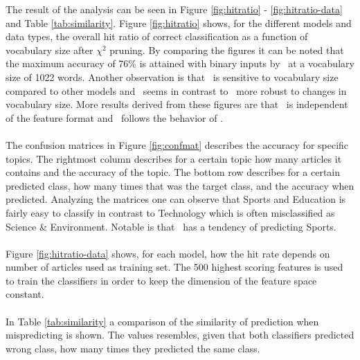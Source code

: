 \label{sec:result}
The result of the analysis can be seen in Figure \ref{fig:hitratio} - \ref{fig:hitratio-data} and Table \ref{tab:similarity}. Figure \ref{fig:hitratio} shows, for the different models and data types, the overall hit ratio of correct classification as a function of vocabulary size after $\chi^2$ pruning. By comparing the figures it can be noted that the maximum accuracy of 76\% is attained with binary inputs by \mn\ at a vocabulary size of 1022 words. Another observation is that \bn\ is sensitive to vocabulary size compared to other models and \svm\  seems in contrast to \bn\ more robust to changes in vocabulary size. More results derived from these figures are that \rf\ is independent of the feature format and \hy\ follows the behavior of \mn.
\\\\
The confusion matrices in Figure \ref{fig:confmat} describes the accuracy for specific topics. The rightmost column describes for a certain topic how many articles it contains and the accuracy of the topic. The bottom row describes for a certain predicted class, how many times that was the target class, and the accuracy when predicted. Analyzing the matrices one can observe that Sports and Education is fairly easy to classify in contrast to Technology which is often misclassified as Science \& Environment. Notable is that \rf\ has a tendency of predicting Sports.
\\\\
Figure \ref{fig:hitratio-data} shows, for each model, how the hit rate depends on number of articles used as training set. The 500 highest scoring features is used to train the classifiers in order to keep the dimension of the feature space constant.
\\\\
In Table \ref{tab:similarity} a comparison of the similarity of prediction when mispredicting is shown. The values resembles, given that both classifiers predicted wrong class, how many times they predicted the same class.

\onecolumn

\onecolumn

\onecolumn

\twocolumn
